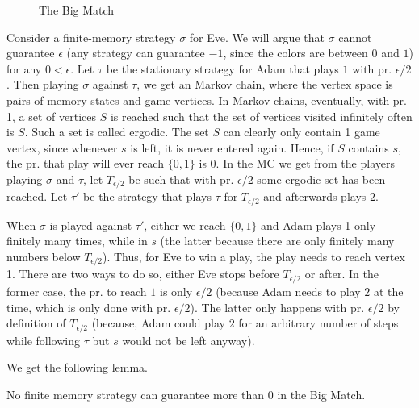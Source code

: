 \begin{figure}

\center
{}
\caption{The Big Match}\label{7-fig:bm}
\end{figure}

Consider a finite-memory strategy $\sigma$ for Eve. We will argue that $\sigma$ cannot guarantee $\epsilon$ (any strategy can guarantee $-1$, since the colors are between $0$ and $1$) for any $0<\epsilon$. Let $\tau$ be the stationary strategy for Adam that plays $1$ with pr. $\epsilon/2$.
Then playing $\sigma$ against $\tau$, we get an Markov chain, where the vertex space is pairs of memory states and game vertices. 
In Markov chains, eventually, with pr. 1, a set of vertices $S$ is reached such that the set of vertices visited infinitely often is $S$. Such a set is called ergodic.
The set $S$ can clearly only contain 1 game vertex, since whenever $s$ is left, it is never entered again.
Hence, if $S$ contains $s$, the pr. that play will ever reach $\{0,1\}$ is 0.
In the MC we get from the players playing $\sigma$ and $\tau$, let $T_{\epsilon/2}$ be such that with pr. $\epsilon/2$ some ergodic set has been reached. 
Let $\tau'$ be the strategy that plays $\tau$ for $T_{\epsilon/2}$ and afterwards plays $2$. 

When $\sigma$ is played against $\tau'$, either we reach $\{0,1\}$ and Adam plays 1 only finitely many times, while in $s$ (the latter because there are only finitely many numbers below $T_{\epsilon/2}$). Thus, for Eve to win a play, the play needs to reach vertex 1. There are two ways to do so, either Eve stops before $T_{\epsilon/2}$ or after. In the former case, the pr. to reach $1$ is only $\epsilon/2$ (because Adam needs to play $2$ at the time, which is only done with pr. $\epsilon/2$). The latter only happens with pr. $\epsilon/2$ by definition of $T_{\epsilon/2}$ (because, Adam could play $2$ for an arbitrary number of steps while following $\tau$ but $s$ would not be left anyway).

We get the following lemma.

\begin{lemma}\label{lemm:no_finite_meanpayoff}
No finite memory strategy can guarantee more than $0$ in the Big Match.
\end{lemma}

